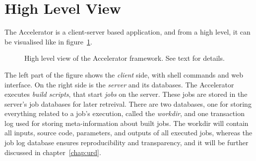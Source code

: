 




\section{High Level View}
The Accelerator is a client-server based application, and from a high
level, it can be visualised like in figure~\ref{fig:overview}.

\begin{figure}[h!]
  \begin{center}
    \vspace{2ex}
    
    \caption{High level view of the Accelerator framework.  See text
      for details.}
    \label{fig:overview}
  \end{center}
\end{figure}

The left part of the figure shows the \emph{client} side, with shell
commands and web interface.  On the right side is the \emph{server}
and its databases.  The Accelerator executes \textsl{build scripts},
that start \textsl{jobs} on the server.  These jobs are stored in the
server's job databases for later retreival.  There are two databases,
one for storing everything related to a job's execution, called the
\textsl{workdir}, and one transaction log used for storing
meta-information about built jobs.  The workdir will contain all
inputs, source code, parameters, and outputs of all executed jobs,
whereas the job log database ensures reproducibility and transparency,
and it will be further discussed in chapter~\ref{chap:urd}.


